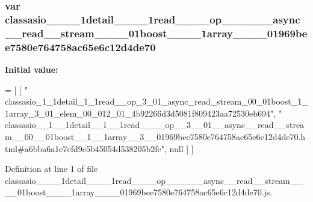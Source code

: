 \subsubsection[{classasio\+\_\+\+\_\+1\+\_\+\+\_\+1detail\+\_\+\+\_\+1\+\_\+\+\_\+1read\+\_\+\+\_\+\+\_\+\+\_\+op\+\_\+\+\_\+3\+\_\+\+\_\+01\+\_\+\+\_\+async\+\_\+\+\_\+read\+\_\+\+\_\+stream\+\_\+\+\_\+00\+\_\+\+\_\+01boost\+\_\+\+\_\+1\+\_\+\+\_\+1array\+\_\+\+\_\+3\+\_\+\+\_\+01969bee7580e764758ac65e6c12d4de70}]{\setlength{\rightskip}{0pt plus 5cm}var classasio\+\_\+\+\_\+\_\+\+\_\+1detail\+\_\+\+\_\+\_\+\+\_\+1read\+\_\+\+\_\+\+\_\+\+\_\+op\+\_\+\+\_\+\_\+\+\_\+\_\+\+\_\+async\+\_\+\+\_\+read\+\_\+\+\_\+stream\+\_\+\+\_\+\_\+\+\_\+01boost\+\_\+\+\_\+\_\+\+\_\+1array\+\_\+\+\_\+\_\+\+\_\+01969bee7580e764758ac65e6c12d4de70}\label{classasio____1____1detail____1____1read________op____3____01____async____read____stream____00___8d6cfe2a04d22f2e6a0ed0babcc6699b_a99336d596eaeb1d6b72329b77f0e7b6d}
{\bfseries Initial value\+:}
\begin{DoxyCode}
=
[
    [ \textcolor{stringliteral}{"
      classasio\_1\_1detail\_1\_1read\_\_op\_3\_01\_async\_read\_stream\_00\_01boost\_1\_1array\_3\_01\_elem\_00\_012\_01\_4b92266d3d5081f809423aa72530eb694"}, \textcolor{stringliteral}{"
      classasio\_\_1\_\_1detail\_\_1\_\_1read\_\_\_\_op\_\_3\_\_01\_\_async\_\_read\_\_stream\_\_00\_\_01boost\_\_1\_\_1array\_\_3\_\_01969bee7580e764758ac65e6c12d4de70.html#a6bba6a1e7cfd9c5b45054d538205b2fc"}, null ]
]
\end{DoxyCode}


Definition at line 1 of file classasio\+\_\+\+\_\+\_\+\+\_\+1detail\+\_\+\+\_\+\_\+\+\_\+1read\+\_\+\+\_\+\+\_\+\+\_\+op\+\_\+\+\_\+\_\+\+\_\+\_\+\+\_\+async\+\_\+\+\_\+read\+\_\+\+\_\+stream\+\_\+\+\_\+\_\+\+\_\+01boost\+\_\+\+\_\+\_\+\+\_\+1array\+\_\+\+\_\+\_\+\+\_\+01969bee7580e764758ac65e6c12d4de70.\+js.

